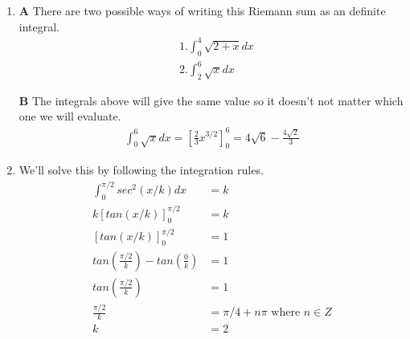 \documentclass[13pt, a4paper, twoside]{article}
\begin{document}
\begin{enumerate}
\item \textbf{A} There are two possible ways of writing this Riemann sum as an definite integral.
\begin{align*}
    &1. \int_0^4 \sqrt{2 + x}dx \\
    &2. \int_2^6 \sqrt{x}dx
\end{align*}

\textbf{B} The integrals above will give the same value so it doesn't not matter
which one we will evaluate.
\begin{align*}
    \int_0^6 \sqrt{x} dx =  [\frac{2}{3}x^{3/2}]_0^6 = 4\sqrt{6} - \frac{4\sqrt{2}}{3}
\end{align*}

\item We'll solve this by following the integration rules.
\begin{align*}
    \int^{\pi/2}_0 sec^2(x/k)dx &= k\\
    k[tan(x/k)]^{\pi/2}_0 &= k \\
    [tan(x/k)]^{\pi/2}_0 &= 1 \\
    tan(\frac{\pi/2}{k}) - tan(\frac{0}{k}) &= 1\\
    tan(\frac{\pi/2}{k}) &= 1 \\
    \frac{\pi/2}{k} &= \pi/4 + n\pi \text{ where } n\in Z\\
    k &= 2
\end{align*}


\end{enumerate}
\end{document}
